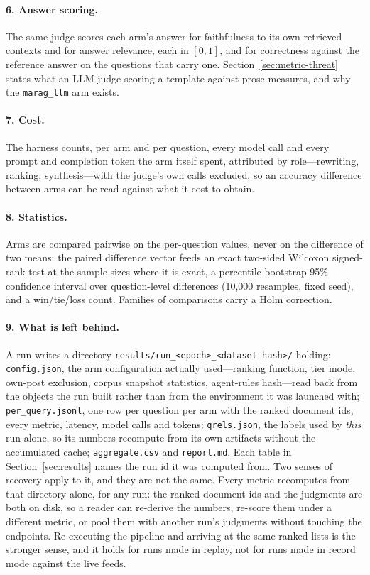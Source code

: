 \documentclass[acmsmall,anonymous,screen]{acmart}
\begin{document}
\paragraph{6. Answer scoring.} The same judge scores each arm's answer for
faithfulness to its own retrieved contexts and for answer relevance, each in
$[0,1]$, and for correctness against the reference answer on the questions that
carry one. Section~\ref{sec:metric-threat} states what an LLM judge scoring a
template against prose measures, and why the \texttt{marag\_llm} arm exists.

\paragraph{7. Cost.} The harness counts, per arm and per question, every model
call and every prompt and completion token the arm itself spent, attributed by
role---rewriting, ranking, synthesis---with the judge's own calls excluded, so
an accuracy difference between arms can be read against what it cost to obtain.

\paragraph{8. Statistics.} Arms are compared pairwise on the per-question
values, never on the difference of two means: the paired difference vector
feeds an exact two-sided Wilcoxon signed-rank test at the sample sizes where it
is exact, a percentile bootstrap 95\% confidence interval over question-level
differences (10{,}000 resamples, fixed seed), and a win/tie/loss count.
Families of comparisons carry a Holm correction.

\paragraph{9. What is left behind.} A run writes a directory
\texttt{results/run\_\textless epoch\textgreater\_\textless dataset
hash\textgreater/} holding: \texttt{config.json}, the arm configuration
actually used---ranking function, tier mode, own-post exclusion, corpus
snapshot statistics, agent-rules hash---read back from the objects the run
built rather than from the environment it was launched with;
\texttt{per\_query.jsonl}, one row per question per arm with the ranked
document ids, every metric, latency, model calls and tokens;
\texttt{qrels.json}, the labels used by \emph{this} run alone, so its numbers
recompute from its own artifacts without the accumulated cache;
\texttt{aggregate.csv} and \texttt{report.md}. Each table in
Section~\ref{sec:results} names the run id it was computed from. Two senses of
recovery apply to it, and they are not the same. Every metric recomputes from
that directory alone, for any run: the ranked document ids and the judgments
are both on disk, so a reader can re-derive the numbers, re-score them under a
different metric, or pool them with another run's judgments without touching
the endpoints. Re-executing the pipeline and arriving at the same ranked lists
is the stronger sense, and it holds for runs made in replay, not for runs made
in record mode against the live feeds.
\end{document}
